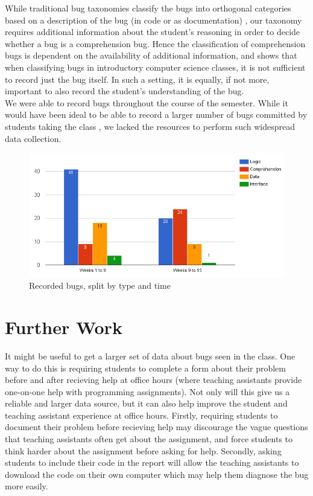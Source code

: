 \documentclass{sig-alternate}
\begin{document}
While traditional bug taxonomies classify the bugs into orthogonal categories based on a description of the bug (in code or as documentation) \cite{Beizer90}, our taxonomy requires additional information about the student's reasoning in order to decide whether a bug is a comprehension bug. Hence the classification of comprehension bugs is dependent  on the availability of additional information, and shows that when classifying bugs in introductory computer science classes, it is not sufficient to record just the bug itself. In such a setting, it is equally, if not more, important to also record the student's understanding of the bug.\\

We were able to record \numtotal bugs throughout the course of the semester. While it would have been ideal to be able to record a larger number of bugs committed by students taking the class \cite{BryceCooleyHansenHayrapetyan10}, we lacked the resources to perform such widespread data collection.

\begin{figure}
\centering
\includegraphics[scale=0.38]{figures/types.png}
\caption{Recorded bugs, split by type and time}
\label{fig:types}
\end{figure}


\section{Further Work}
It might be useful to get a larger set of data about bugs seen in the class. One way to do this is requiring students to complete a form about their problem before and after recieving help at office hours (where teaching assistants provide one-on-one help with programming assignments). Not only will this give us a reliable and larger data source, but it can also help improve the student and teaching assistant experience at office hours. Firstly, requiring students to document their problem before recieving help may discourage the vague questions that teaching assistants often get about the assignment, and force students to think harder about the assignment before asking for help. Secondly, asking students to include their code in the report will allow the teaching assistants to download the code on their own computer which may help them diagnose the bug more easily.\\
\end{document}
